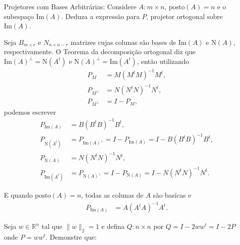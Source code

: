 \documentclass[a4paper,12pt, leqno, answers]{exam}
\newcommand{\EI}[1]{\text{Im}(#1)}
\newcommand{\posto}[1]{\text{posto}(#1)}
\begin{document}
\begin{questions}
     Projetores com Bases Arbitr\'{a}rias: Considere $A : m \times n$, $\posto{A} = n$ e o subespa\c{c}o $\EI{A}$. Deduza a express\~{a}o para $P$, projetor ortogonal sobre $\EI{A}$.
    \begin{solution}
        Seja $B_{m \times r}$ e $N_{n \times n - r}$ matrizes cujas colunas s\~{a}o bases de $\text{Im}(A)$ e $\text{N}(A)$, respectivamente. O Teorema da decomposi\c{c}\~{a}o ortogonal diz que $\text{Im}(A)^\perp = \text{N}(A^t)$ e $\text{N}(A)^\perp = \text{Im}(A^t)$, ent\~{a}o utilizando
        \begin{align*}
            P_M &= M \left( M^t M \right)^{-1} M^t, \\
            P_{M^\perp} &= N \left( N^t N \right)^{-1} N^t, \\
            P_{M^\perp} & = I - P_M,
        \end{align*}
        podemos escrever
        \begin{align*}
            P_{\text{Im}(A)} &= B \left( B^t B \right)^{-1} B^t, \\
            P_{\text{N}(A^t)} &= P_{\text{Im}(A)^\perp} = I - P_{\text{Im}(A)} = I - B \left( B^t B \right)^{-1} B^t, \\
            P_{\text{N}(A)} &= N \left( N^t N \right)^{-1} N^t, \\
            P_{\text{Im}(A^t)} &= P_{\text{N}(A)^\perp} = I - P_{\text{N}(A)} = I - N \left( N^t N \right)^{-1} N^t.
        \end{align*}

        E quando $\text{posto}(A) = n$, todas as colunas de $A$ s\~{a}o bas\'{i}cas e
        \begin{align*}
            P_{\text{Im}(A)} &= A \left( A^t A \right)^{-1} A^t.
        \end{align*}
    \end{solution}

    \question Seja $w \in \mathbb{R}^n$ tal que $\| w \|_2 = 1$ e defina $Q : n \times n$ por $Q = I - 2 w w^t = I - 2P$ onde $P = w w^t$. Demonstre que:
\end{questions}
\end{document}

